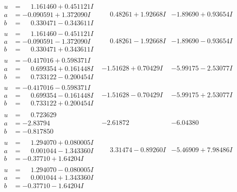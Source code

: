 \documentclass[1p]{elsarticle_modified}
\theoremstyle{definition}
\begin{document}
$$\begin{array}{c|c|c}
\begin{aligned}
u &= \phantom{-}1.161460 + 0.451121 I \\
a &= -0.090591 + 1.372090 I \\
b &= \phantom{-}0.330471 - 0.343611 I\end{aligned}
 & \phantom{-}0.48261 + 1.92668 I & -1.89690 + 0.93654 I \\ \hline\begin{aligned}
u &= \phantom{-}1.161460 - 0.451121 I \\
a &= -0.090591 - 1.372090 I \\
b &= \phantom{-}0.330471 + 0.343611 I\end{aligned}
 & \phantom{-}0.48261 - 1.92668 I & -1.89690 - 0.93654 I \\ \hline\begin{aligned}
u &= -0.417016 + 0.598371 I \\
a &= \phantom{-}0.699354 + 0.161448 I \\
b &= \phantom{-}0.733122 - 0.200454 I\end{aligned}
 & -1.51628 + 0.70429 I & -5.99175 - 2.53077 I \\ \hline\begin{aligned}
u &= -0.417016 - 0.598371 I \\
a &= \phantom{-}0.699354 - 0.161448 I \\
b &= \phantom{-}0.733122 + 0.200454 I\end{aligned}
 & -1.51628 - 0.70429 I & -5.99175 + 2.53077 I \\ \hline\begin{aligned}
u &= \phantom{-}0.723629\phantom{ +0.000000I} \\
a &= -2.83794\phantom{ +0.000000I} \\
b &= -0.817850\phantom{ +0.000000I}\end{aligned}
 & -2.61872\phantom{ +0.000000I} & -6.04380\phantom{ +0.000000I} \\ \hline\begin{aligned}
u &= \phantom{-}1.294070 + 0.080005 I \\
a &= \phantom{-}0.001044 - 1.343360 I \\
b &= -0.37710 + 1.64204 I\end{aligned}
 & \phantom{-}3.31474 - 0.89260 I & -5.46909 + 7.98486 I \\ \hline\begin{aligned}
u &= \phantom{-}1.294070 - 0.080005 I \\
a &= \phantom{-}0.001044 + 1.343360 I \\
b &= -0.37710 - 1.64204 I\end{aligned}

\end{array}$$
\end{document}
